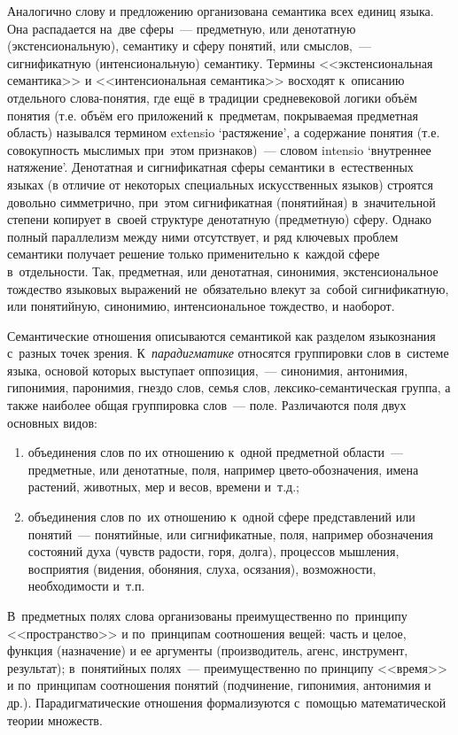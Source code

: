 \documentclass[12pt]{article}
\theoremstyle{definition}
\theoremstyle{remark}
\numberwithin{equation}{section}
\begin{document}
Аналогично слову и предложению организована семантика всех единиц языка.
Она распадается на~две сферы~--- предметную, или денотатную (экстенсиональную),
семантику и сферу понятий, или смыслов,~--- сигнификатную (интенсиональную)
семантику. Термины <<экстенсиональная семантика>> и <<интенсиональная семантика>>
восходят к~описанию отдельного слова-понятия, где ещё в традиции средневековой
логики объём понятия (т.е. объём его приложений к~предметам, покрываемая
предметная область) назывался термином extensio ‘растяжение’, а содержание
понятия (т.е. совокупность мыслимых при~этом признаков)~--- словом intensio
‘внутреннее натяжение’. Денотатная и сигнификатная сферы семантики в~естественных
языках (в отличие от некоторых специальных искусственных языков) строятся
довольно симметрично, при~этом сигнификатная (понятийная) в~значительной
степени копирует в~своей структуре денотатную (предметную) сферу. Однако
полный параллелизм между ними отсутствует, и ряд ключевых проблем семантики
получает решение только применительно к~каждой сфере в~отдельности. Так,
предметная, или денотатная, синонимия, экстенсиональное тождество языковых
выражений не~обязательно влекут за~собой сигнификатную, или понятийную,
синонимию, интенсиональное тождество, и наоборот.

Семантические отношения описываются семантикой как разделом языкознания
с~разных точек зрения. К~{\sl парадигматике} относятся группировки слов в~системе
языка, основой которых выступает оппозиция,~--- синонимия, антонимия, гипонимия,
паронимия, гнездо слов, семья слов, лексико-семантическая группа, а также
наиболее общая группировка слов~--- поле. Различаются поля двух основных
видов:
\begin{enumerate}
    \item объединения слов по их отношению к~одной предметной области~---
    предметные, или денотатные, поля, например цвето-обозначения, имена
    растений, животных, мер и весов, времени и~т.д.;
    \item объединения слов по~их отношению к~одной сфере представлений или
    понятий~--- понятийные, или сигнификатные, поля, например обозначения
    состояний духа (чувств радости, горя, долга), процессов мышления,
    восприятия (видения, обоняния, слуха, осязания), возможности, необходимости
    и~т.п.
\end{enumerate}
В~предметных полях слова организованы преимущественно по~принципу <<пространство>>
и по~принципам соотношения вещей: часть и целое, функция (назначение) и ее
аргументы (производитель, агенс, инструмент, результат); в~понятийных полях~---
преимущественно по принципу <<время>> и по~принципам соотношения понятий
(подчинение, гипонимия, антонимия и др.). Парадигматические отношения
формализуются с~помощью математической теории множеств.
\end{document}
